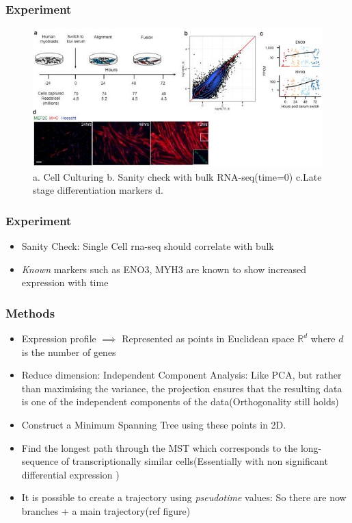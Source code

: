 \documentclass[10pt]{beamer}
\begin{document}
\begin{frame}[fragile]
	\frametitle{Experiment}
	\begin{figure}
		\includegraphics{images/expt1}
		\caption{a. Cell Culturing b. Sanity check with bulk RNA-seq(time=0) c.Late stage differentiation markers d. }
	\end{figure}
\end{frame}


\begin{frame}[fragile]
	\frametitle{Experiment}
	\begin{itemize}[<+- | alert@+>]
		\item Sanity Check: Single Cell rna-seq should correlate with bulk
		\item \emph{Known} markers such as ENO3, MYH3 are known to show increased expression with time
	\end{itemize}
\end{frame}

\begin{frame}[fragile]
	\frametitle{Methods}
	\begin{itemize}[<+- | alert@+>]
		\item Expression profile $\implies$ Represented as points in Euclidean space $\mathbb{R}^d$ where $d$ is the number of genes
		\item Reduce dimension: Independent Component Analysis:  Like PCA, but rather than maximising the variance, the projection ensures that the resulting data is one of the independent components of the data(Orthogonality still holds) 
		\item Construct a Minimum Spanning Tree using these points in 2D.
		\item Find the longest path through the MST which corresponds to the long-sequence of transcriptionally similar cells(Essentially with non significant differential expression )
		\item It is possible to create a trajectory using \emph{pseudotime} values: So there are now branches + a main trajectory(ref figure)
	\end{itemize}
\end{frame}
\end{document}
